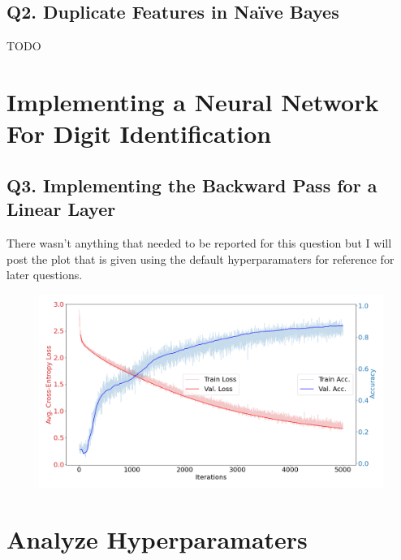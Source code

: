 \documentclass{article}
\begin{document}
\subsection*{Q2. Duplicate Features in Naïve Bayes}
    TODO

\section*{Implementing a Neural Network For Digit Identification}
\subsection*{Q3. Implementing the Backward Pass for a Linear Layer}
There wasn't anything that needed to be reported for this question but I will post the plot that is given using the default hyperparamaters for reference for later questions.

\begin{figure}[H]
    \includegraphics[scale = 0.4]{default.png} 
\end{figure}

\section*{Analyze Hyperparamaters}
\end{document}
